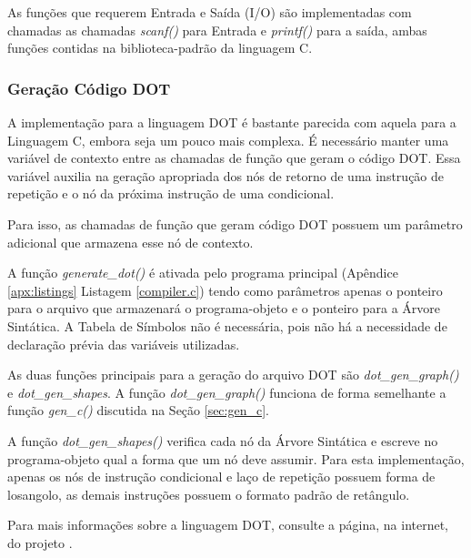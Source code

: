 As funções que requerem Entrada e Saída (I/O) são implementadas com chamadas
as chamadas \emph{scanf()} para Entrada e \emph{printf()} para a saída, ambas
funções contidas na biblioteca-padrão da linguagem C.

\subsubsection{Geração Código DOT}
\label{sec:gen_dot}

A implementação para a linguagem DOT é bastante parecida com aquela para a
Linguagem C, embora seja um pouco mais complexa. É necessário manter uma
variável de contexto entre as chamadas de função que geram o código DOT.
Essa variável auxilia na geração apropriada dos nós de retorno de uma
instrução de repetição e o nó da próxima instrução de uma condicional.

Para isso, as chamadas de função que geram código DOT possuem um parâmetro
adicional que armazena esse nó de contexto.

A função \emph{generate\_dot()} é ativada pelo programa principal
(Apêndice \ref{apx:listings} Listagem \ref{compiler.c}) tendo como parâmetros
apenas o ponteiro para o arquivo que armazenará o programa-objeto e o ponteiro
para a Árvore Sintática. A Tabela de Símbolos não é necessária, pois não há a
necessidade de declaração prévia das variáveis utilizadas.

As duas funções principais para a geração do arquivo DOT são
\emph{dot\_gen\_graph()} e \emph{dot\_gen\_shapes}. A função
\emph{dot\_gen\_graph()} funciona de forma semelhante a função
\emph{gen\_c()} discutida na Seção \ref{sec:gen_c}.

A função \emph{dot\_gen\_shapes()} verifica cada nó da Árvore Sintática e
escreve no programa-objeto qual a forma que um nó deve assumir. Para esta
implementação, apenas os nós de instrução condicional e laço de repetição
possuem forma de losangolo, as demais instruções possuem o formato padrão de
retângulo.

Para mais informações sobre a linguagem DOT, consulte a página, na internet, do
projeto .

